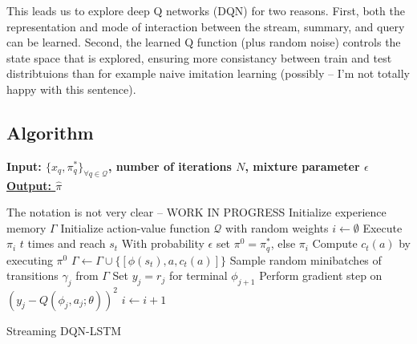 \documentclass[12pt]{article}
\begin{document}
  This leads us to explore deep Q networks (DQN) for two reasons. 
  First, both the 
  representation and mode of interaction between the stream, summary, and 
  query can be learned. 
  Second, the learned Q function (plus random noise) controls the state 
  space that is explored, ensuring more consistancy between train and test 
  distribtuions than for example naive imitation learning 
  (possibly -- I'm not totally happy with this sentence).

\subsection{Algorithm}

\begin{algorithm}
    \bf{Input:} { \rm $\{ x_q, \pi^{*}_q \}_{\forall q \in \mathcal{Q} }$, number of iterations $N$, mixture parameter $\epsilon$  } \\
    \underline{\bf{Output:}  $\hat{\pi}$ }
  \begin{algorithmic}[1]
  \STATE The notation is not very clear -- WORK IN PROGRESS
  \STATE \rm Initialize experience memory $\Gamma$
  \STATE \rm Initialize action-value function $\mathcal{Q}$ with random weights
    \STATE \rm $i \leftarrow \emptyset$ 
        \STATE \rm Execute $\pi_i$ $t$ times and reach $s_t$
        		\STATE \rm With probability $\epsilon$ set $\pi^0 = \pi^{*}_q$, else $\pi_i$
		\STATE Compute $c_t(a)$ by executing $\pi^0$
		\STATE $\Gamma \leftarrow \Gamma \cup \{ [\phi(s_t), a, c_t(a)]\}$
		\ENDFOR
        \ENDFOR
        \STATE Sample random minibatches of transitions $\gamma_j$ from $\Gamma$
        \STATE Set $y_j = r_j$ for terminal $\phi_{j+1}$
        \STATE Perform gradient step on $(y_j - Q(\phi_j, a_j; \theta))^2$
        \STATE $i \leftarrow i + 1$
      \ENDFOR
    \ENDFOR
  \end{algorithmic}
    \caption{Streaming DQN-LSTM}
\end{algorithm}
\end{document}
